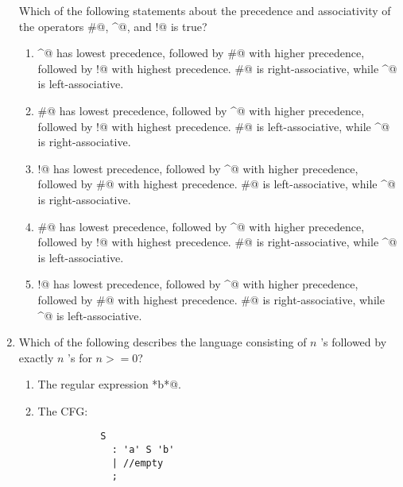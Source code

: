 \documentclass[12pt]{article}
\begin{document}
\begin{enumerate}
Which of the following statements about the precedence and associativity of
the operators \verb@#@, \verb@^@, and \verb@!@ is true?

\begin{enumerate}

  \item \verb@^@ has lowest precedence, followed by \verb@#@ with
    higher precedence, followed by \verb@!@ with highest precedence.
    \verb@#@ is right-associative, while \verb@^@ is left-associative.

  \item \verb@#@ has lowest precedence, followed by \verb@^@ with
    higher precedence, followed by \verb@!@ with highest precedence.
    \verb@#@ is left-associative, while \verb@^@ is right-associative.

  \item \verb@!@ has lowest precedence, followed by \verb@^@ with
    higher precedence, followed by \verb@#@ with highest precedence.
    \verb@#@ is left-associative, while \verb@^@ is right-associative.

  \item \verb@#@ has lowest precedence, followed by \verb@^@ with
    higher precedence, followed by \verb@!@ with highest precedence.
    \verb@#@ is right-associative, while \verb@^@ is left-associative.

  \item \verb@!@ has lowest precedence, followed by \verb@^@ with
    higher precedence, followed by \verb@#@ with highest precedence.
    \verb@#@ is right-associative, while \verb@^@ is left-associative.

      
    
\end{enumerate}

\newpage

\item Which of the following describes the language consisting of
$n$ \verb@a@'s followed by exactly $n$ \verb@b@'s for $n >= 0$?

\begin{enumerate}

\item The regular expression \verb@a*b*@.

\item The CFG:
\begin{verbatim}
           S
             : 'a' S 'b'
             | //empty
             ;
\end{verbatim}


\end{enumerate}
\end{enumerate}
\end{document}
